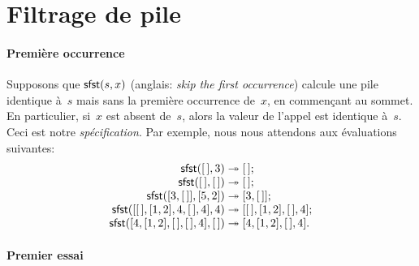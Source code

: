 \section{Filtrage de pile}
\label{sec:skipping}

\paragraph{Première occurrence}
\label{def:linear_search}

Supposons que \(\textsf{sfst}(s,x)\) (anglais:
\emph{skip the first occurrence}) calcule une pile identique à~\(s\)
mais sans la première occurrence de~\(x\), en commençant au sommet. En
particulier, si~\(x\) est absent de~\(s\), alors la valeur de l'appel
est identique à~\(s\). Ceci est notre
\emph{spécification}. Par exemple, nous nous
attendons aux évaluations suivantes:\label{sfst_ex}
\begin{equation*}
\begin{array}{r@{\;}l@{\;}l}
\fun{sfst}(\el,3) & \twoheadrightarrow & \el;\\
\fun{sfst}(\el,\el) & \twoheadrightarrow & \el;\\
\fun{sfst}([3,\el],[5,2]) & \twoheadrightarrow & [3,\el];\\
\fun{sfst}([\el,[1,2],4,\el,4],4) & \twoheadrightarrow &
  [\el,[1,2],\el,4];\\
\fun{sfst}([4,[1,2],\el,\el,4],\el)
 & \twoheadrightarrow & [4,[1,2],\el,4].
\end{array}
\end{equation*}

\paragraph{Premier essai}

